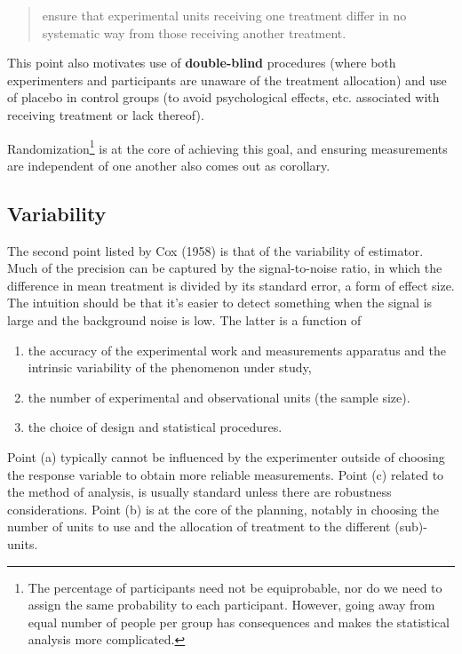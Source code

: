 \documentclass[
  11pt,
  letterpaper,
]{scrbook}
\providecommand{\tightlist}{%
  \setlength{\itemsep}{0pt}\setlength{\parskip}{0pt}}\usepackage{longtable,booktabs,array}
\theoremstyle{definition}
\theoremstyle{definition}
\theoremstyle{remark}
\begin{document}
\begin{quote}
ensure that experimental units receiving one treatment differ in no
systematic way from those receiving another treatment.
\end{quote}

This point also motivates use of \textbf{double-blind} procedures (where
both experimenters and participants are unaware of the treatment
allocation) and use of placebo in control groups (to avoid psychological
effects, etc. associated with receiving treatment or lack thereof).

Randomization\footnote{The percentage of participants need not be
  equiprobable, nor do we need to assign the same probability to each
  participant. However, going away from equal number of people per group
  has consequences and makes the statistical analysis more complicated.}
is at the core of achieving this goal, and ensuring measurements are
independent of one another also comes out as corollary.

\subsection{Variability}\label{variability}

The second point listed by Cox (1958) is that of the variability of
estimator. Much of the precision can be captured by the signal-to-noise
ratio, in which the difference in mean treatment is divided by its
standard error, a form of effect size. The intuition should be that it's
easier to detect something when the signal is large and the background
noise is low. The latter is a function of

\begin{enumerate}
\def\labelenumi{(\alph{enumi})}
\tightlist
\item
  the accuracy of the experimental work and measurements apparatus and
  the intrinsic variability of the phenomenon under study,
\item
  the number of experimental and observational units (the sample size).
\item
  the choice of design and statistical procedures.
\end{enumerate}

Point (a) typically cannot be influenced by the experimenter outside of
choosing the response variable to obtain more reliable measurements.
Point (c) related to the method of analysis, is usually standard unless
there are robustness considerations. Point (b) is at the core of the
planning, notably in choosing the number of units to use and the
allocation of treatment to the different (sub)-units.
\end{document}
